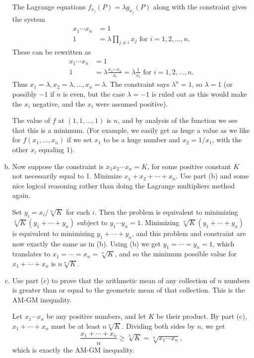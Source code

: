 \begin{problem}
\begin{enumerate}[(a)]
\begin{solution}
      The Lagrange equations $f_{x_j}(P)=\lambda g_{x_j}(P)$ along with the constraint gives the system
      \begin{align*}
        x_1\cdots x_n &= 1\\
        1 &= \lambda\prod_{j\neq i}x_j\text{ for }i=1,2,\dots,n.
      \end{align*}
      These can be rewritten as
      \begin{align*}
        x_1\cdots x_n &= 1\\
        1 &= \lambda\frac{x_1\cdots x_n}{x_i}=\lambda\frac{1}{x_i}\text{ for }i=1,2,\dots,n.
      \end{align*}
      Thus $x_1=\lambda,x_2=\lambda,\dots,x_n=\lambda$. The constraint says $\lambda^n=1$, so $\lambda=1$ (or possibly $-1$ if $n$ is even, but the case $\lambda=-1$ is ruled out as this would make the $x_i$ negative, and the $x_i$ were assumed positive).

      The value of $f$ at $(1,1,\dots,1)$ is $n$, and by analysis of the function we see that this is a minimum. (For example, we easily get as huge a value as we like for $f(x_1,\dots,x_n)$ if we set $x_1$ to be a huge number and $x_2=1/x_1$, with the other $x_i$ equaling 1).
    \end{solution}
    \item Now suppose the constraint is $x_1x_2\cdots x_n=K$, for some positive constant $K$ not necessarily equal to 1. Minimize $x_1+x_2+\cdots+x_n$. Use part (b) and some nice logical reasoning rather than doing the Lagrange multipliers method again.
    \begin{solution}
      Set $y_i=x_i/\sqrt[n]K$ for each $i$. Then the problem is equivalent to minimizing $\sqrt[n]K(y_1+\cdots+y_n)$ subject to $y_1\cdots y_n=1$. Minimizing $\sqrt[n]K(y_1+\cdots+y_n)$ is equivalent to minimizing $y_1+\cdots+y_n$, and this problem and constraint are now exactly the same as in (b). Using (b) we get $y_1=\cdots=y_n=1$, which translates to $x_1=\cdots=x_n=\sqrt[n]K$, and so the minimum possible value for $x_1+\cdots+x_n$ is $n\sqrt[n]K$.
    \end{solution}
    \item Use part (c) to prove that the arithmetic mean of any collection of $n$ numbers is greater than or equal to the geometric mean of that collection. This is the AM-GM inequality.
    \begin{solution}
      Let $x_1\cdots x_n$ be any positive numbers, and let $K$ be their product. By part (c), $x_1+\cdots+x_n$ must be at least $n\sqrt[n]K$. Dividing both sides by $n$, we get
      \[\frac{x_1+\cdots+x_n}n\geq\sqrt[n]K=\sqrt[n]{x_1\cdots x_n},\]
      which is exactly the AM-GM inequality.
    \end{solution}
  \end{enumerate}
\end{problem}

